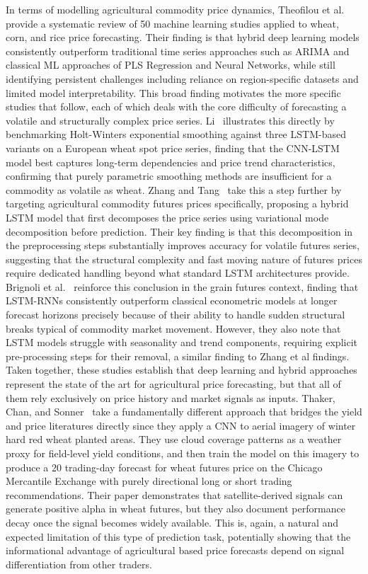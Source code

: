 \documentclass[pdflatex,sn-mathphys-num, oneside, 11pt]{sn-jnl}%
\theoremstyle{thmstyleone}%
\theoremstyle{thmstyletwo}%
\theoremstyle{thmstylethree}%
\begin{document}
In terms of modelling agricultural commodity price dynamics, Theofilou et al.~\cite{bib21} provide a systematic review of 50 machine learning studies applied to wheat, corn, and rice price forecasting. Their finding is that hybrid deep learning models consistently outperform traditional time series approaches such as ARIMA and classical ML approaches of PLS Regression and Neural Networks, while still identifying persistent challenges including reliance on region-specific datasets and limited model interpretability. This broad finding motivates the more specific studies that follow, each of which deals  with the core difficulty of forecasting a volatile and structurally complex price series. Li~\cite{bib18} illustrates this directly by benchmarking Holt-Winters exponential smoothing against three LSTM-based variants on a European wheat spot price series, finding that the CNN-LSTM model best captures long-term dependencies and price trend characteristics, confirming that purely parametric smoothing methods are insufficient for a commodity as volatile as wheat. Zhang and Tang~\cite{bib22} take this a step further by targeting agricultural commodity futures prices specifically, proposing a hybrid LSTM model that first decomposes the price series using variational mode decomposition before prediction. Their key finding is that this decomposition in the preprocessing steps substantially improves accuracy for volatile futures series, suggesting that the structural complexity and fast moving nature of futures prices require dedicated handling beyond what standard LSTM architectures provide. Brignoli et al.~\cite{bib23} reinforce this conclusion in the grain futures context, finding that LSTM-RNNs consistently outperform classical econometric models at longer forecast horizons precisely because of their ability to handle sudden structural breaks typical of commodity market movement. However, they also note that LSTM models struggle with seasonality and trend components, requiring explicit pre-processing steps for their removal, a similar finding to Zhang et al\cite{bib22} findings. Taken together, these studies establish that deep learning and hybrid approaches represent the state of the art for agricultural price forecasting, but that all of them rely exclusively on price history and market signals as inputs. Thaker, Chan, and Sonner~\cite{bib19} take a fundamentally different approach that bridges the yield and price literatures directly since they apply a CNN to aerial imagery of winter hard red wheat planted areas. They use cloud coverage patterns as a weather proxy for field-level yield conditions, and then train the model on this imagery to produce a 20 trading-day forecast for wheat futures price on the Chicago Mercantile Exchange with purely directional long or short trading recommendations. Their paper demonstrates that satellite-derived signals can generate positive alpha in wheat futures, but they also document performance decay once the signal becomes widely available. This is, again, a natural and expected limitation of this type of prediction task, potentially showing that the informational advantage of agricultural based price forecasts depend on signal differentiation from other traders.\\
 
\end{document}
